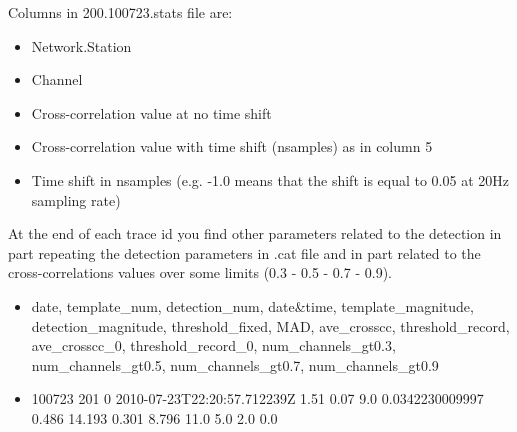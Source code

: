 \documentclass[a4paper,10pt,english]{sphinxmanual}
\begin{document}
\begin{sphinxVerbatim}[commandchars=\\\{\}]
     
     
     
               
\end{sphinxVerbatim}

Columns in 200.100723.stats file are:
\begin{itemize}
\item {} 
Network.Station

\item {} 
Channel

\item {} 
Cross-correlation value at no time shift

\item {} 
Cross-correlation value with time shift (nsamples) as in column 5

\item {} 
Time shift in nsamples (e.g. -1.0 means that the shift is equal to 0.05 at 20Hz sampling rate)

\end{itemize}

At the end of each trace id you find other parameters related to the detection in part repeating the detection parameters
in .cat file and in part related to the cross-correlations values over some limits (0.3 - 0.5 - 0.7 - 0.9).
\begin{itemize}
\item {} 
date, template\_num, detection\_num, date\&time, template\_magnitude, detection\_magnitude, threshold\_fixed, MAD, ave\_crosscc, threshold\_record, ave\_crosscc\_0, threshold\_record\_0, num\_channels\_gt0.3, num\_channels\_gt0.5, num\_channels\_gt0.7, num\_channels\_gt0.9

\item {} 
100723 201 0 2010-07-23T22:20:57.712239Z 1.51 0.07 9.0 0.0342230009997 0.486 14.193 0.301 8.796 11.0 5.0 2.0 0.0

\end{itemize}
\end{document}
